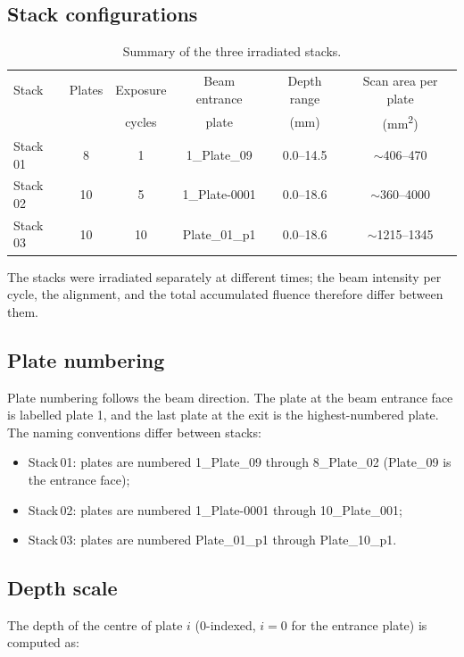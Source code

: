 \documentclass[12pt,a4paper]{article}
\begin{document}
\subsection{Stack configurations}

\begin{table}[H]
\centering
\caption{Summary of the three irradiated stacks.}
\label{tab:stacks}
\begin{tabular}{lccccc}
\toprule
Stack & Plates & Exposure & Beam entrance & Depth range &
Scan area per plate \\
 & & cycles & plate & (mm) & (mm\textsuperscript{2}) \\
\midrule
Stack\,01 & 8 & 1 & 1\_Plate\_09 & 0.0--14.5 & $\sim$406--470 \\
Stack\,02 & 10 & 5 & 1\_Plate-0001 & 0.0--18.6 & $\sim$360--4000 \\
Stack\,03 & 10 & 10 & Plate\_01\_p1 & 0.0--18.6 & $\sim$1215--1345 \\
\bottomrule
\end{tabular}
\end{table}

The stacks were irradiated separately at different times; the beam
intensity per cycle, the alignment, and the total accumulated fluence
therefore differ between them.

\subsection{Plate numbering}

Plate numbering follows the beam direction. The plate at the beam
entrance face is labelled plate 1, and the last plate at the exit is
the highest-numbered plate. The naming conventions differ between
stacks:
\begin{itemize}
  \item Stack\,01: plates are numbered 1\_Plate\_09 through
        8\_Plate\_02 (Plate\_09 is the entrance face);
  \item Stack\,02: plates are numbered 1\_Plate-0001 through
        10\_Plate\_001;
  \item Stack\,03: plates are numbered Plate\_01\_p1 through
        Plate\_10\_p1.
\end{itemize}

\subsection{Depth scale}

The depth of the centre of plate $i$ (0-indexed, $i=0$ for the
entrance plate) is computed as:
\end{document}
